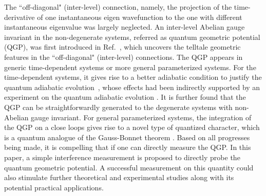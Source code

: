 \documentclass[aps,pra,twocolumn,
groupedaddress,10pt]{revtex4}
\begin{document}
The ``off-diagonal"
(inter-level) connection, namely, the projection of the time-derivative of
one instantaneous eigen wavefunction to the one with different instantaneous eigenvalue
was largely neglected. An inter-level Abelian gauge invariant in the non-degenerate
systems, referred as
quantum geometric potential (QGP), was first introduced in Ref.~\citep{Jianda2008},
which uncovers the telltale geometric features in the ``off-diagonal"
(inter-level) connections. The QGP appears in generic time-dependent systems
or more general parameterized systems. For the time-dependent systems,
it gives rise to
a better adiabatic condition to justify the quantum adiabatic evolution~\citep{Jianda2008}, whose
effects had been indirectly supported by an experiment on
the quantum adiabatic evolution \cite{Du2008}.
It is further found that the QGP can be straightforwardly generated
to the degenerate systems with non-Abelian gauge invariant.
For general parameterized systems,
the integration of the QGP on a close loops gives rise to
a novel type of quantized character, which is a quantum analogue of the Gauss-Bonnet
theorem \cite{Xu2017}. Based on all progresses being made,
it is compelling that
if one can directly measure the QGP. In this paper,
a simple interference measurement is proposed to
directly probe the quantum geometric potential.
A successful measurement on this quantity could
also stimulate further theoretical and experimental studies
along with its potential practical applications.
\end{document}
